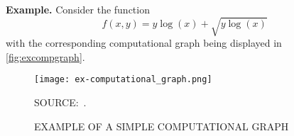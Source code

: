 \noindent\textbf{Example.}\hspace{.5cm}
Consider the function
\[
 f(x, y) = y\log(x) + \sqrt{y\log(x)}
\]
with the corresponding computational graph being displayed in
\autoref{fig:excompgraph}.

\begin{figure}[H]
 \setlength{\abovecaptionskip}{.0001pt}
 \caption{EXAMPLE OF A SIMPLE COMPUTATIONAL GRAPH}
 \vspace{0.3cm}\centering
 \texttt{[image: ex-computational\_graph.png]}\\
 \vspace{0.3cm}
 \begin{footnotesize}
  SOURCE:~.
 \end{footnotesize}
 \label{fig:excompgraph}
\end{figure}

